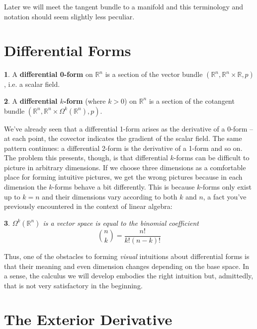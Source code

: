 \documentclass[oneside,english]{amsbook}
\numberwithin{section}{chapter}
\theoremstyle{plain}
\newtheorem{thm}{\protect\theoremname}
\theoremstyle{definition}
\newtheorem{defn}[thm]{\protect\definitionname}
\providecommand{\definitionname}{Definition}
\providecommand{\theoremname}{Theorem}
\begin{document}
			Later we will meet the tangent bundle to a manifold and this terminology and notation should seem slightly less peculiar.
			
		\section{Differential Forms}
		
			\begin{defn}
				A \textbf{differential 0-form} on $\mathbb{R}^n$ is a section of the vector bundle $(\mathbb{R}^n, \mathbb{R}^n\times \mathbb{R}, p)$, i.e. a scalar field.
			\end{defn}

			\begin{defn}
				A \textbf{differential $k$-form} (where $k > 0$) on $\mathbb{R}^n$ is a section of the cotangent bundle $(\mathbb{R}^n, \mathbb{R}^n\times \Omega^k(\mathbb{R}^n), p)$.
			\end{defn}
			
			We've already seen that a differential 1-form arises as the derivative of a 0-form -- at each point, the covector indicates the gradient of the scalar field. The same pattern continues: a differential 2-form is the derivative of a 1-form and so on. The problem this presents, though, is that differential $k$-forms can be difficult to picture in arbitrary dimensions. If we choose three dimensions as a comfortable place for forming intuitive pictures, we get the wrong pictures because in each dimension the $k$-forms behave a bit differently. This is because $k$-forms only exist up to $k=n$ and their dimensions vary according to both $k$ and $n$, a fact you've previously encountered in the context of linear algebra:
			
			\begin{thm}
				$\Omega^k(\mathbb{R}^n)$ is a vector space is equal to the binomial coefficient 
				\[
					\binom{n}{k} = \frac{n!}{k!(n-k)!}
				\]
			\end{thm}
			
			Thus, one of the obstacles to forming \emph{visual} intuitions about differential forms is that their meaning and even dimension changes depending on the base space. In a sense, the calculus we will develop embodies the right intuition but, admittedly, that is not very satisfactory in the beginning. 

		\section{The Exterior Derivative}
\end{document}
